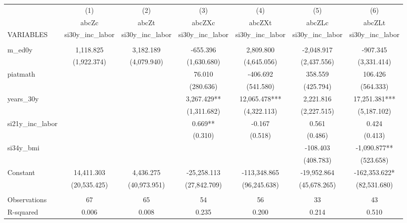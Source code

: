 \begin{tabular}{lcccccc} \hline
 & (1) & (2) & (3) & (4) & (5) & (6) \\
 & abcZc & abcZt & abcZXc & abcZXt & abcZLc & abcZLt \\
VARIABLES & si30y\_inc\_labor & si30y\_inc\_labor & si30y\_inc\_labor & si30y\_inc\_labor & si30y\_inc\_labor & si30y\_inc\_labor \\ \hline
 &  &  &  &  &  &  \\
m\_ed0y & 1,118.825 & 3,182.189 & -655.396 & 2,809.800 & -2,048.917 & -907.345 \\
 & (1,922.374) & (4,079.940) & (1,630.680) & (4,645.056) & (2,437.556) & (3,331.414) \\
piatmath &  &  & 76.010 & -406.692 & 358.559 & 106.426 \\
 &  &  & (280.636) & (541.580) & (425.794) & (564.333) \\
years\_30y &  &  & 3,267.429** & 12,065.478*** & 2,221.816 & 17,251.381*** \\
 &  &  & (1,311.682) & (4,322.113) & (2,227.515) & (5,187.102) \\
si21y\_inc\_labor &  &  & 0.669** & -0.167 & 0.561 & 0.424 \\
 &  &  & (0.310) & (0.518) & (0.486) & (0.413) \\
si34y\_bmi &  &  &  &  & -108.403 & -1,090.877** \\
 &  &  &  &  & (408.783) & (523.658) \\
Constant & 14,411.303 & 4,436.275 & -25,258.113 & -113,348.865 & -19,952.864 & -162,353.622* \\
 & (20,535.425) & (40,973.951) & (27,842.709) & (96,245.638) & (45,678.265) & (82,531.680) \\
 &  &  &  &  &  &  \\
Observations & 67 & 65 & 54 & 56 & 33 & 43 \\
 R-squared & 0.006 & 0.008 & 0.235 & 0.200 & 0.214 & 0.510 \\ \hline
\end{tabular}
